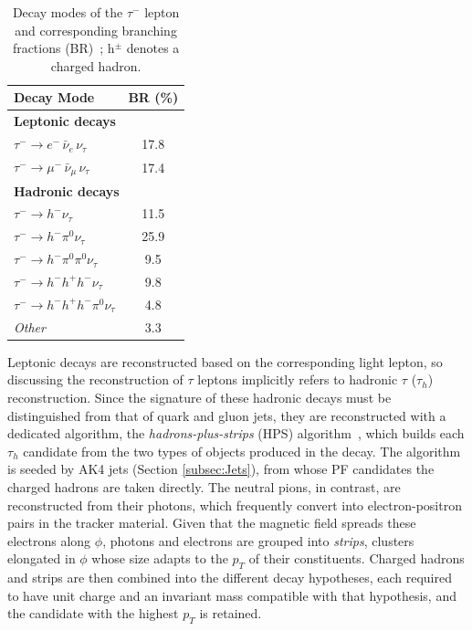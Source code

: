 \begin{table}[h!]
    \centering
    \begin{tabular}{l c}
        \hline
        \textbf{Decay Mode} & \textbf{BR (\%)} \\
        \hline
        \multicolumn{2}{l}{\textbf{Leptonic decays}} \\
        $\tau^- \to e^- \,\bar{\nu}_e\, \nu_\tau$ & 17.8 \\
        $\tau^- \to \mu^- \,\bar{\nu}_\mu\, \nu_\tau$ & 17.4 \\
        \hline
        \multicolumn{2}{l}{\textbf{Hadronic decays}} \\
        $\tau^- \to h^- \nu_\tau$ & 11.5 \\
        $\tau^- \to h^- \pi^0 \nu_\tau$ & 25.9 \\
        $\tau^- \to h^- \pi^0 \pi^0 \nu_\tau$ & 9.5 \\
        $\tau^- \to h^- h^+ h^- \nu_\tau$ & 9.8 \\
        $\tau^- \to h^- h^+ h^- \pi^0 \nu_\tau$ & 4.8 \\
        \textit{Other} & 3.3 \\
        \hline
    \end{tabular}
    \caption{Decay modes of the $\tau^-$ lepton and corresponding branching fractions (BR)~\cite{ParticleDataGroup:2026mpi}; h$^{\pm}$ denotes a charged hadron.}
    \label{tab:tau_decays}
\end{table}

Leptonic decays are reconstructed based on the corresponding light lepton, so discussing the reconstruction of $\tau$ leptons implicitly refers to hadronic $\tau$ ($\tau_h$) reconstruction. Since the signature of these hadronic decays must be distinguished from that of quark and gluon jets, they are reconstructed with a dedicated algorithm, the \textit{hadrons-plus-strips} (HPS) algorithm~\cite{CMS-TAU-14-001,CMS-TAU-16-003}, which builds each $\tau_h$ candidate from the two types of objects produced in the decay. The algorithm is seeded by AK4 jets (Section \ref{subsec:Jets}), from whose PF candidates the charged hadrons are taken directly. The neutral pions, in contrast, are reconstructed from their photons, which frequently convert into electron-positron pairs in the tracker material. Given that the magnetic field spreads these electrons along $\phi$, photons and electrons are grouped into \textit{strips}, clusters elongated in $\phi$ whose size adapts to the $p_T$ of their constituents. Charged hadrons and strips are then combined into the different decay hypotheses, each required to have unit charge and an invariant mass compatible with that hypothesis, and the candidate with the highest $p_T$ is retained.

